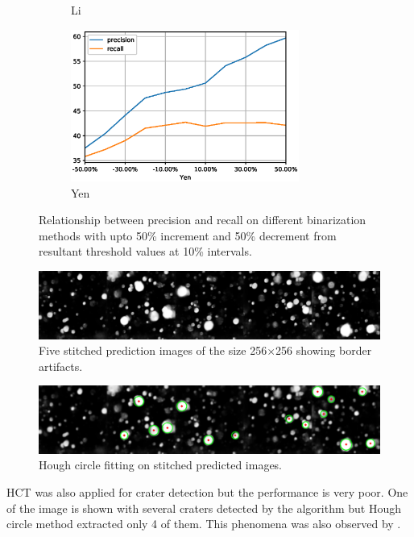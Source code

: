 \documentclass[11pt]{article}
\begin{document}
\begin{figure}[H]
\begin{subfigure}{7cm}
		\caption{Li}
	\end{subfigure}
	\begin{subfigure}[b]{1.0\textwidth}
		\centering
		\includegraphics[width=7.5cm]{files/results/yen.eps}
		\caption{Yen}
	\end{subfigure}

	\caption{Relationship between precision and recall on different binarization methods with upto 50\% increment and 50\% decrement from resultant threshold values at 10\% intervals.}
	\label{thresh_methods}
\end{figure}

\begin{figure}[H]
	\centering
	\includegraphics[width=.8\textwidth]{files/results/hcon_thesis-1.png}
	\caption{Five stitched prediction images of the size 256$\times$256 showing border artifacts.}
	\label{artifacts}
\end{figure}

\begin{figure}[H]
	\centering
	\includegraphics[width=.8\textwidth]{files/results/with_circles.png}
	\caption{Hough circle fitting on stitched predicted images.}
	\label{hough_stitched}
\end{figure}

HCT was also applied for crater detection but the performance is very poor. One of the image is shown with several craters detected by the algorithm but Hough circle method extracted only 4 of them. This phenomena was also observed by \cite{wetzler2005learning}.
\end{document}
